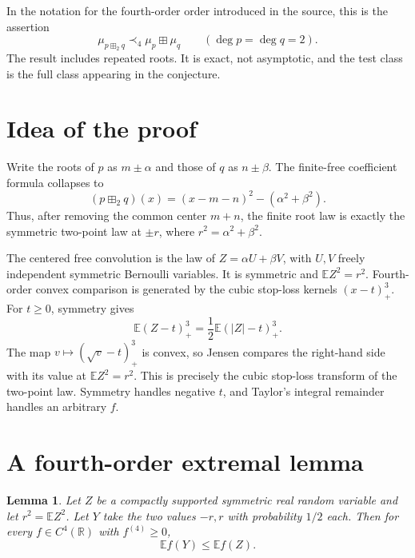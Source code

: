 \documentclass[11pt]{article}
\newtheorem{lemma}[theorem]{Lemma}
\theoremstyle{remark}
\newcommand{\R}{\mathbb{R}}
\newcommand{\E}{\mathbb{E}}
\newcommand{\ffbox}{\mathbin{\boxplus_{2}}}
\newcommand{\freebox}{\mathbin{\boxplus}}
\newcommand{\pos}[1]{\left(#1\right)_{+}}
\begin{document}
In the notation for the fourth-order order introduced in the source, this is
the assertion
\[
 \mu_{p\ffbox q}\prec_4 \mu_p\freebox\mu_q
 \qquad (\deg p=\deg q=2).
\]
The result includes repeated roots.  It is exact, not asymptotic, and the test
class is the full class appearing in the conjecture.

\section{Idea of the proof}

Write the roots of $p$ as $m\pm\alpha$ and those of $q$ as
$n\pm\beta$.  The finite-free coefficient formula collapses to
\[
 (p\ffbox q)(x)=(x-m-n)^2-(\alpha^2+\beta^2).
\]
Thus, after removing the common center $m+n$, the finite root law is exactly
the symmetric two-point law at $\pm r$, where
$r^2=\alpha^2+\beta^2$.

The centered free convolution is the law of $Z=\alpha U+\beta V$, with
$U,V$ freely independent symmetric Bernoulli variables.  It is symmetric and
$\E Z^2=r^2$.  Fourth-order convex comparison is generated by the cubic
stop-loss kernels $\pos{x-t}^3$.  For $t\geq0$, symmetry gives
\[
 \E\pos{Z-t}^3=\frac12\E\pos{|Z|-t}^3.
\]
The map $v\mapsto\pos{\sqrt v-t}^3$ is convex, so Jensen compares the
right-hand side with its value at $\E Z^2=r^2$.  This is precisely the cubic
stop-loss transform of the two-point law.  Symmetry handles negative $t$,
and Taylor's integral remainder handles an arbitrary $f$.

\section{A fourth-order extremal lemma}

\begin{lemma}\label{lem:extremal}
Let $Z$ be a compactly supported symmetric real random variable and let
$r^2=\E Z^2$.  Let $Y$ take the two values $-r,r$ with probability $1/2$
each.  Then for every $f\in C^4(\R)$ with $f^{(4)}\geq0$,
\[
 \E f(Y)\leq \E f(Z).
\]
\end{lemma}
\end{document}
